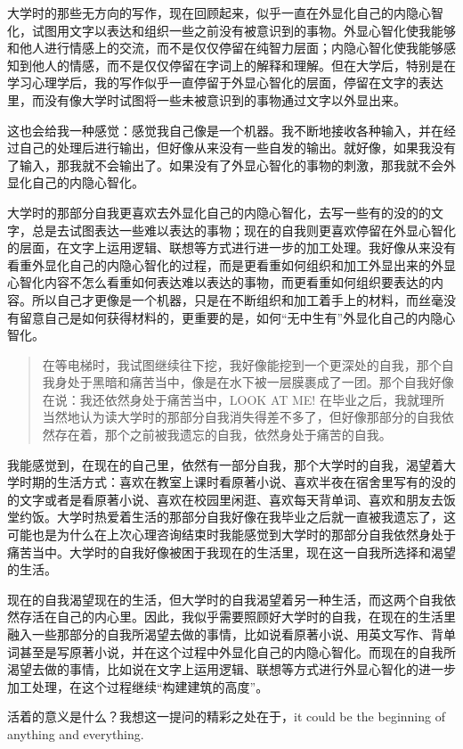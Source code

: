 大学时的那些无方向的写作，现在回顾起来，似乎一直在外显化自己的内隐心智化，试图用文字以表达和组织一些之前没有被意识到的事物。外显心智化使我能够和他人进行情感上的交流，而不是仅仅停留在纯智力层面；内隐心智化使我能够感知到他人的情感，而不是仅仅停留在字词上的解释和理解。但在大学后，特别是在学习心理学后，我的写作似乎一直停留于外显心智化的层面，停留在文字的表达里，而没有像大学时试图将一些未被意识到的事物通过文字以外显出来。

这也会给我一种感觉：感觉我自己像是一个机器。我不断地接收各种输入，并在经过自己的处理后进行输出，但好像从来没有一些自发的输出。就好像，如果我没有了输入，那我就不会输出了。如果没有了外显心智化的事物的刺激，那我就不会外显化自己的内隐心智化。

大学时的那部分自我更喜欢去外显化自己的内隐心智化，去写一些有的没的的文字，总是去试图表达一些难以表达的事物；现在的自我则更喜欢停留在外显心智化的层面，在文字上运用逻辑、联想等方式进行进一步的加工处理。我好像从来没有看重外显化自己的内隐心智化的过程，而是更看重如何组织和加工外显出来的外显心智化内容\pozhehao{}不怎么看重如何表达难以表达的事物，而更看重如何组织要表达的内容。所以自己才更像是一个机器，只是在不断组织和加工着手上的材料，而丝毫没有留意自己是如何获得材料的，更重要的是，如何“无中生有”\pozhehao{}外显化自己的内隐心智化。

\blockquote{
    在等电梯时，我试图继续往下挖，我好像能挖到一个更深处的自我，那个自我身处于黑暗和痛苦当中，像是在水下被一层膜裹成了一团。那个自我好像在说：我还依然身处于痛苦当中，LOOK AT ME!  在毕业之后，我就理所当然地认为读大学时的那部分自我消失得差不多了，但好像那部分的自我依然存在着，那个之前被我遗忘的自我，依然身处于痛苦的自我。
}

我能感觉到，在现在的自己里，依然有一部分自我，那个大学时的自我，渴望着大学时期的生活方式：喜欢在教室上课时看原著小说、喜欢半夜在宿舍里写有的没的的文字或者是看原著小说、喜欢在校园里闲逛、喜欢每天背单词、喜欢和朋友去饭堂约饭。大学时热爱着生活的那部分自我好像在我毕业之后就一直被我遗忘了，这可能也是为什么在上次心理咨询结束时我能感觉到大学时的那部分自我依然身处于痛苦当中。大学时的自我好像被困于我现在的生活里，现在这一自我所选择和渴望的生活。

现在的自我渴望现在的生活，但大学时的自我渴望着另一种生活，而这两个自我依然存活在自己的内心里。因此，我似乎需要照顾好大学时的自我，在现在的生活里融入一些那部分的自我所渴望去做的事情，比如说看原著小说、用英文写作、背单词甚至是写原著小说，并在这个过程中外显化自己的内隐心智化。而现在的自我所渴望去做的事情，比如说在文字上运用逻辑、联想等方式进行外显心智化的进一步加工处理，在这个过程继续“构建建筑的高度”。

活着的意义是什么？我想这一提问的精彩之处在于，it could be the beginning of anything and everything.
